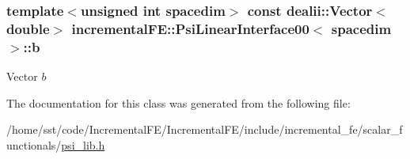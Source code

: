 \subsubsection[{\texorpdfstring{b}{b}}]{\setlength{\rightskip}{0pt plus 5cm}template$<$unsigned int spacedim$>$ const {\bf dealii\+::\+Vector}$<$double$>$ {\bf incremental\+F\+E\+::\+Psi\+Linear\+Interface00}$<$ spacedim $>$\+::b\hspace{0.3cm}{\ttfamily [private]}}\hypertarget{classincremental_f_e_1_1_psi_linear_interface00_a67da23f105ba3e30884099c71c972b56}{}\label{classincremental_f_e_1_1_psi_linear_interface00_a67da23f105ba3e30884099c71c972b56}
Vector $b$ 

The documentation for this class was generated from the following file\+:\begin{DoxyCompactItemize}
\item 
/home/sst/code/\+Incremental\+F\+E/\+Incremental\+F\+E/include/incremental\+\_\+fe/scalar\+\_\+functionals/\hyperlink{psi__lib_8h}{psi\+\_\+lib.\+h}\end{DoxyCompactItemize}
